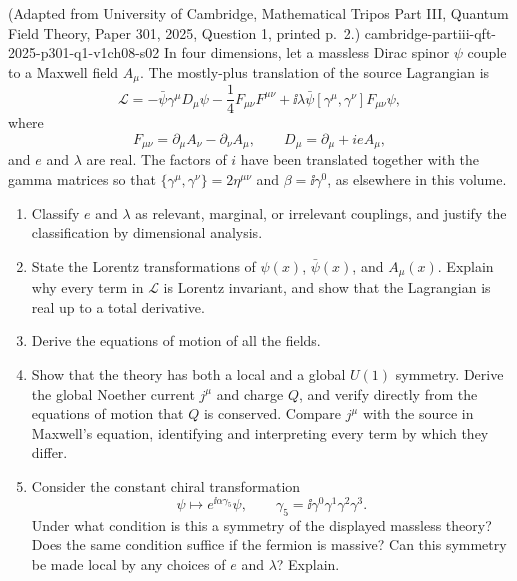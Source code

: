 \begin{enumerate}
  {(Adapted from University of Cambridge, Mathematical Tripos Part III, Quantum Field Theory, Paper 301, 2025, Question 1, printed p.~2.)}
  {cambridge-partiii-qft-2025-p301-q1-v1ch08-s02}
In four dimensions, let a massless Dirac spinor \(\psi\) couple to a Maxwell
field \(A_\mu\).  The mostly-plus translation of the source Lagrangian is
\[
 \mathcal L=-\bar\psi\gamma^\mu D_\mu\psi
 -\frac14F_{\mu\nu}F^{\mu\nu}
 +\ii\lambda\bar\psi[\gamma^\mu,\gamma^\nu]F_{\mu\nu}\psi,
\]
where
\[
 F_{\mu\nu}=\partial_\mu A_\nu-\partial_\nu A_\mu,
 \qquad D_\mu=\partial_\mu+ieA_\mu,
\]
and \(e\) and \(\lambda\) are real.  The factors of \(i\) have been
translated together with the gamma matrices so that
\(\{\gamma^\mu,\gamma^\nu\}=2\eta^{\mu\nu}\) and
\(\beta=\ii\gamma^0\), as elsewhere in this volume.
\begin{enumerate}
\item
Classify \(e\) and \(\lambda\) as relevant, marginal, or irrelevant
couplings, and justify the classification by dimensional analysis.
\item
State the Lorentz transformations of \(\psi(x)\), \(\bar\psi(x)\), and
\(A_\mu(x)\).  Explain why every term in \(\mathcal L\) is Lorentz
invariant, and show that the Lagrangian is real up to a total derivative.
\item
Derive the equations of motion of all the fields.
\item
Show that the theory has both a local and a global \(U(1)\) symmetry.
Derive the global Noether current \(j^\mu\) and charge \(Q\), and verify
directly from the equations of motion that \(Q\) is conserved.  Compare
\(j^\mu\) with the source in Maxwell's equation, identifying and
interpreting every term by which they differ.
\item
Consider the constant chiral transformation
\[
 \psi\longmapsto e^{\ii\alpha\gamma_5}\psi,
 \qquad \gamma_5=\ii\gamma^0\gamma^1\gamma^2\gamma^3.
\]
Under what condition is this a symmetry of the displayed massless theory?
Does the same condition suffice if the fermion is massive?  Can this
symmetry be made local by any choices of \(e\) and \(\lambda\)?  Explain.
\end{enumerate}


\end{enumerate}
